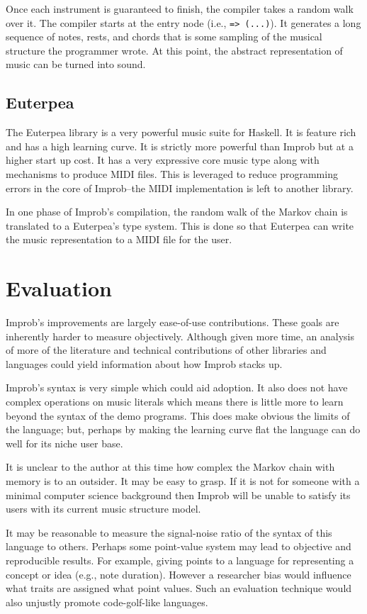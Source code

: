 \documentclass{sigplanconf-pldi15}
\begin{document}
Once each instrument is guaranteed to finish, the compiler takes a random walk over it. The compiler starts at the entry node (i.e., \texttt{=> (...)}). It generates a long sequence of notes, rests, and chords that is some sampling of the musical structure the programmer wrote. At this point, the abstract representation of music can be turned into sound.

\subsection{Euterpea}
The Euterpea library is a very powerful music suite for Haskell. It is feature rich and has a high learning curve. It is strictly more powerful than Improb but at a higher start up cost. It has a very expressive core music type along with mechanisms to produce MIDI files. This is leveraged to reduce programming errors in the core of Improb--the MIDI implementation is left to another library.

In one phase of Improb's compilation, the random walk of the Markov chain is translated to a Euterpea's type system. This is done so that Euterpea can write the music representation to a MIDI file for the user.

\section{Evaluation}
Improb's improvements are largely ease-of-use contributions. These goals are inherently harder to measure objectively. Although given more time, an analysis of more of the literature and technical contributions of other libraries and languages could yield information about how Improb stacks up.

Improb's syntax is very simple which could aid adoption. It also does not have complex operations on music literals which means there is little more to learn beyond the syntax of the demo programs. This does make obvious the limits of the language; but, perhaps by making the learning curve flat the language can do well for its niche user base.

It is unclear to the author at this time how complex the Markov chain with memory is to an outsider. It may be easy to grasp. If it is not for someone with a minimal computer science background then Improb will be unable to satisfy its users with its current music structure model.

It may be reasonable to measure the signal-noise ratio of the syntax of this language to others. Perhaps some point-value system may lead to objective and reproducible results. For example, giving points to a language for representing a concept or idea (e.g., note duration). However a researcher bias would influence what traits are assigned what point values. Such an evaluation technique would also unjustly promote code-golf-like languages.
\end{document}
